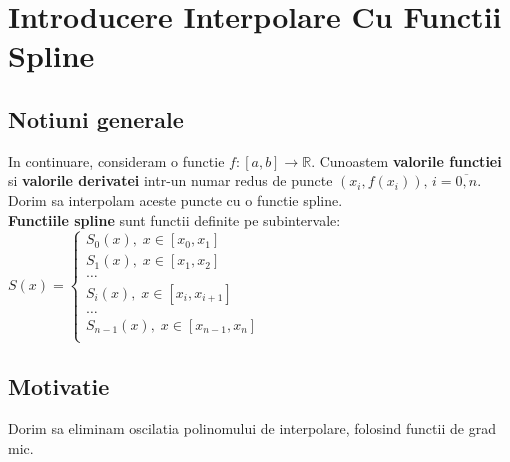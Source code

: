 \documentclass{article}
\begin{document}
\section{Introducere Interpolare Cu Functii Spline}
\label{sec:spline}

\subsection{Notiuni generale}
\tab In continuare, consideram o functie $f:[a,b]\rightarrow\mathbb{R}.$
Cunoastem \textbf{valorile functiei} si \textbf{valorile derivatei} intr-un numar redus de puncte $(x_i, f(x_i)), \, i = \overline{0, n}$. Dorim sa interpolam aceste puncte cu o functie spline.\\

\textbf{Functiile spline} sunt functii definite pe subintervale:
$S(x) = \begin{cases}
    S_0(x),\; x \in [x_0, x_1]\\
    S_1(x),\; x \in [x_1, x_2]\\
    \dots\\
    S_i(x),\; x \in [x_i, x_{i+1}]\\
    \dots\\
    S_{n-1}(x),\; x \in [x_{n-1}, x_n]\\
\end{cases}$

\subsection{Motivatie}

\tab Dorim sa eliminam oscilatia polinomului de interpolare, folosind functii de grad mic.
\end{document}
